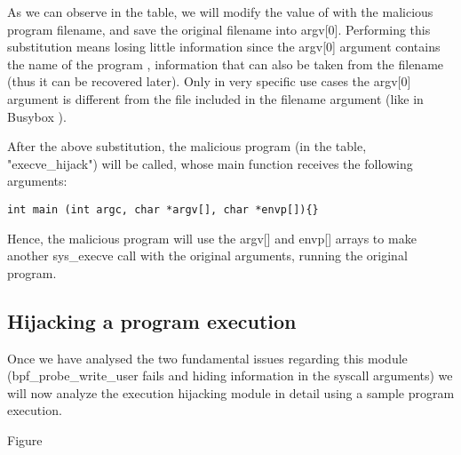 As we can observe in the table, we will modify the value of  with the malicious program filename, and save the original filename into argv[0]. Performing this substitution means losing little information since the argv[0] argument contains the name of the program \cite{c_standard_main}, information that can also be taken from the filename (thus it can be recovered later). Only in very specific use cases the argv[0] argument is different from the file included in the filename argument (like in Busybox \cite{busybox_argv}). 

After the above substitution, the malicious program (in the table, "execve\_hijack") will be called, whose main function receives the following arguments:

\begin{verbatim}
int main (int argc, char *argv[], char *envp[]){}
\end{verbatim}

Hence, the malicious program will use the argv[] and envp[] arrays to make another sys\_execve call with the original arguments, running the original program. 

\subsection{Hijacking a program execution}
Once we have analysed the two fundamental issues regarding this module (bpf\_probe\_write\_user fails and hiding information in the syscall arguments) we will now analyze the execution hijacking module in detail using a sample program execution.

Figure









